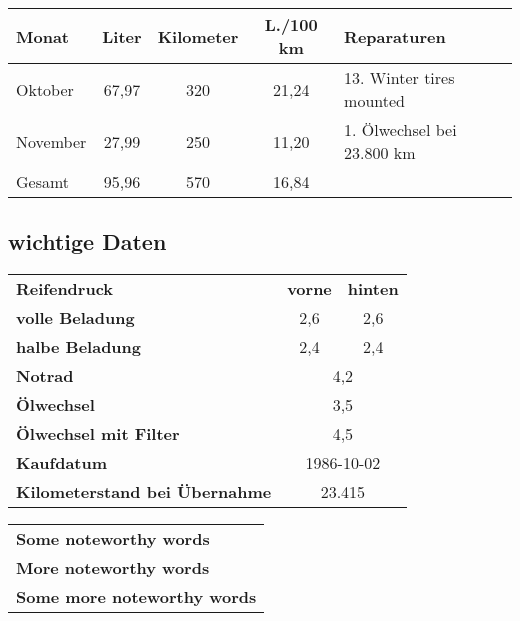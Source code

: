 \documentclass[11pt, a4paper]{article}
\begin{document}
\begin{tabular}{|l|c|c|c|l|}
\hline
Monat & Liter & Kilometer & L./100 km & Reparaturen \\
\hline
Oktober & 67,97 & 320 & 21,24 & 13. Winter tires mounted\\
November & 27,99 & 250 & 11,20 & 1. Ölwechsel bei 23.800 km\\
\hline
Gesamt & 95,96 & 570 & 16,84 & \\
\hline
\end{tabular}

\newpage

\subsection*{wichtige Daten}

\begin{tabular}{lcc}\textbf{Reifendruck} & \textbf{vorne} & \textbf{hinten} \\
\textbf{volle Beladung} & 2,6 & 2,6 \\
\textbf{halbe Beladung} & 2,4 & 2,4 \\
\textbf{Notrad} & \multicolumn{2}{c}{4,2} \\
\textbf{Ölwechsel} & \multicolumn{2}{c}{3,5} \\
\textbf{Ölwechsel mit Filter} & \multicolumn{2}{c}{4,5} \\
\textbf{Kaufdatum} & \multicolumn{2}{c}{1986-10-02} \\
\textbf{Kilometerstand bei Übernahme} & \multicolumn{2}{c}{23.415} \\
\end{tabular}

\begin{tabular}{l}
\textbf{Some noteworthy words} \\
\textbf{More noteworthy words} \\
\textbf{Some more noteworthy words} \\
\end{tabular}

\ifpdf
{}
\else
{}
\fi
\end{document}
